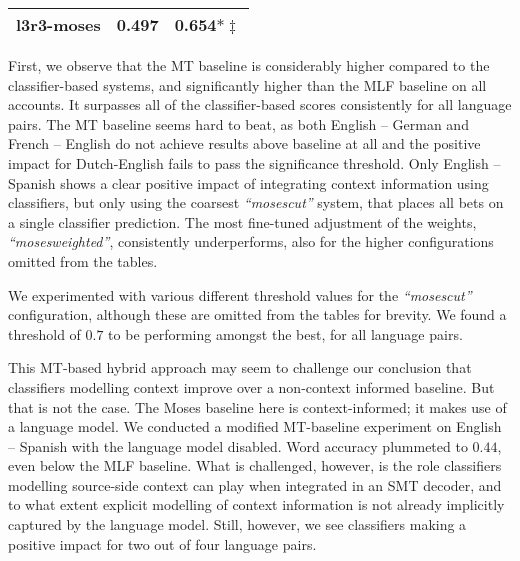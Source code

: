\begin{table}[htb]
{\begin{tabular}{lrr}
l3r3-moses & 0.497 & 0.654$*\ddagger$ \\%
\hline
\end{tabular}}
\end{table}

First, we observe that the MT baseline is considerably higher compared to the
classifier-based systems, and significantly higher than the MLF baseline on all
accounts. It surpasses all of the classifier-based scores consistently for all
language pairs. The MT baseline seems hard to beat, as both English -- German
and French -- English do not achieve results above baseline at all and the
positive impact for Dutch-English fails to pass the significance threshold.
Only English -- Spanish shows a clear positive impact of integrating context
information using classifiers, but only using the coarsest \emph{``mosescut''}
system, that places all bets on a single classifier prediction. The most
fine-tuned adjustment of the weights, \emph{``mosesweighted''}, consistently
underperforms, also for the higher configurations omitted from the tables.

We experimented with various different threshold values for the \emph{``mosescut''}
configuration, although these are omitted from the tables for brevity. We found
a threshold of $0.7$ to be performing amongst the best, for all language pairs.

This MT-based hybrid approach may seem to challenge our conclusion that classifiers
modelling context improve over a non-context informed baseline. But that is not
the case. The Moses baseline here is context-informed; it makes use of
a language model. We conducted a modified MT-baseline experiment on
English -- Spanish with the language model disabled. Word accuracy plummeted to
$0.44$, even below the MLF baseline. What is challenged, however, is the role
classifiers modelling source-side context can play when integrated in an SMT
decoder, and to what extent explicit modelling of context information is not
already implicitly captured by the language model. Still, however, we see
classifiers making a positive impact for two out of four language pairs.

